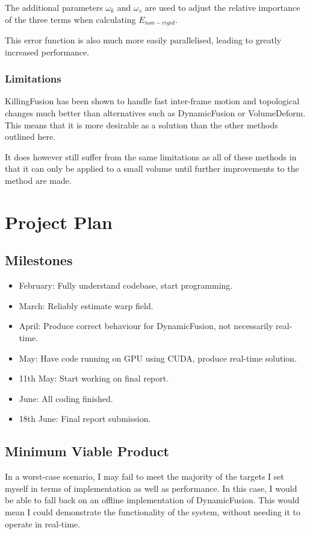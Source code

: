 \documentclass[a4paper]{article}
\begin{document}
The additional parameters $\omega_k$ and $\omega_s$ are used to adjust the relative importance of the three terms when calculating $E_{non-rigid}$.

This error function is also much more easily parallelised, leading to greatly increased performance.\\


\subsubsection{Limitations}

KillingFusion has been shown to handle fast inter-frame motion and topological changes much better than alternatives such as DynamicFusion or VolumeDeform. This means that it is more desirable as a solution than the other methods outlined here.

It does however still suffer from the same limitations as all of these methods in that it can only be applied to a small volume until further improvements to the method are made.

\newpage
\section{Project Plan}

\subsection{Milestones}
\begin{itemize}
\item February: Fully understand codebase, start programming.
\item March: Reliably estimate warp field.
\item April: Produce correct behaviour for DynamicFusion, not necessarily real-time.
\item May: Have code running on GPU using CUDA, produce real-time solution.
\item 11th May: Start working on final report.
\item June: All coding finished.
\item 18th June: Final report submission.
\end{itemize}

\subsection{Minimum Viable Product}

In a worst-case scenario, I may fail to meet the majority of the targets I set myself in terms of implementation as well as performance. In this case, I would be able to fall back on an offline implementation of DynamicFusion. This would mean I could demonstrate the functionality of the system, without needing it to operate in real-time.
\end{document}
